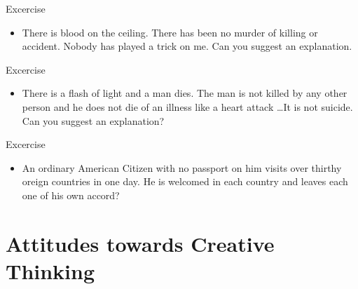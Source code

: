 \documentclass[notes]{beamer}
\begin{document}
\begin{frame}{Excercise}
	\begin{itemize}
		\item There is blood on the ceiling. There has been no murder of killing or accident. Nobody has played a trick on me. Can you suggest an explanation. 
	\end{itemize}

\end{frame}

\begin{frame}{Excercise}
	\begin{itemize}
		\item There is a flash of light and a man dies. The man is not killed by any other person and he does not die of an illness like a heart attack \dots It is not suicide. Can you suggest an explanation?
	\end{itemize}
	
\end{frame} 

\begin{frame}{Excercise}
	\begin{itemize}
		\item An ordinary American Citizen with no passport on him visits over thirthy oreign countries in one day. He is welcomed in each country and leaves each one of his own accord?
	\end{itemize}
	
\end{frame}

\section{Attitudes towards Creative Thinking}

\end{document}
